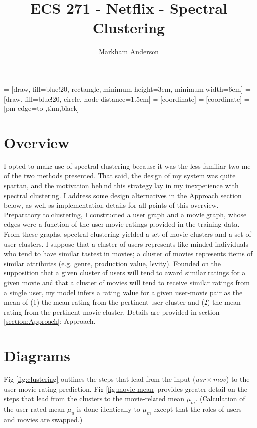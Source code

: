 \documentclass{article}
\title{ECS 271 - Netflix - Spectral Clustering}
\author{Markham Anderson}
\begin{document}
 = [draw, fill=blue!20, rectangle, minimum height=3em, minimum width=6em]
 = [draw, fill=blue!20, circle, node distance=1.5cm]
 = [coordinate]
 = [coordinate]
 = [pin edge={to-,thin,black}]

\maketitle

\section{Overview} \label{section:Overview}

    I opted to make use of spectral clustering because it was the less familiar two me of the two methods presented. That said, the design of my system was quite spartan, and the motivation behind this strategy lay in my inexperience with spectral clustering. I address some design alternatives in the Approach section below, as well as implementation details for all points of this overview. Preparatory to clustering, I constructed a user graph and a movie graph, whose edges were a function of the user-movie ratings provided in the training data. From these graphs, spectral clustering yielded a set of movie clusters and a set of user clusters. I suppose that a cluster of users represents like-minded individuals who tend to have similar tastest in movies; a cluster of movies represents items of similar attributes (e.g. genre, production value, levity). Founded on the supposition that a given cluster of users will tend to award similar ratings for a given movie and that a cluster of movies will tend to receive similar ratings from a single user, my model infers a rating value for a given user-movie pair as the mean of (1) the mean rating from the pertinent user cluster and (2) the mean rating from the pertinent movie cluster. Details are provided in section \ref{section:Approach}: Approach.

\section{Diagrams} \label{section:Diagrams}

    Fig \ref{fig:clustering} outlines the steps that lead from the input ($usr \times mov$) to the user-movie rating prediction. Fig \ref{fig:movie-mean} provides greater detail on the steps that lead from the clusters to the movie-related mean $\mu_m$. (Calculation of the user-rated mean $\mu_u$ is done identically to $\mu_m$ except that the roles of users and movies are swapped.)
\end{document}
